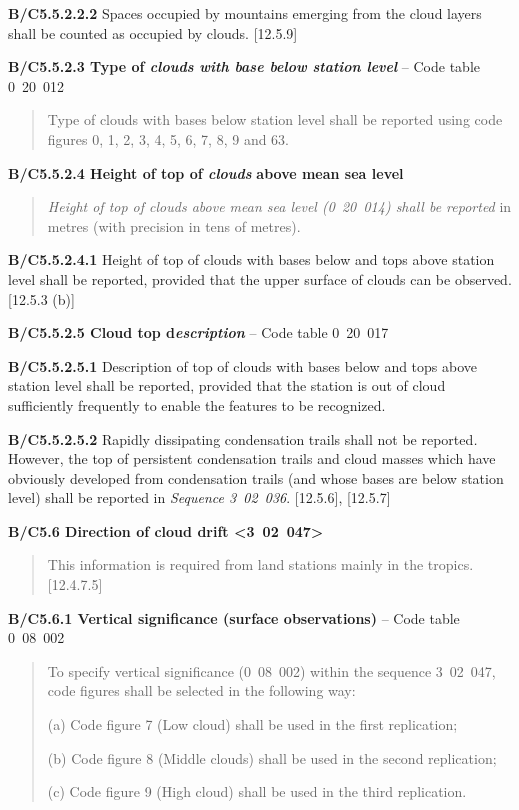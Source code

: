 \textbf{B/C5.5.2.2.2} Spaces occupied by mountains emerging from the cloud layers shall be counted as occupied by clouds. {[}12.5.9{]}

\textbf{B/C5.5.2.3 Type of \emph{clouds with base below station level}} -- Code table 0~20~012

\begin{quote}
Type of clouds with bases below station level shall be reported using code figures 0, 1, 2, 3, 4, 5, 6, 7, 8, 9 and 63.
\end{quote}

\textbf{B/C5.5.2.4 Height of top of \emph{clouds}} \textbf{above mean sea level}

\begin{quote}
\emph{Height of top of clouds above mean sea level (0~20~014) shall be reported} in metres (with precision in tens of metres).
\end{quote}

\textbf{B/C5.5.2.4.1} Height of top of clouds with bases below and tops above station level shall be reported, provided that the upper surface of clouds can be observed. {[}12.5.3 (b){]}

\textbf{B/C5.5.2.5 Cloud top d\emph{escription }}-- Code table 0~20~017

\textbf{B/C5.5.2.5.1} Description of top of clouds with bases below and tops above station level shall be reported, provided that the station is out of cloud sufficiently frequently to enable the features to be recognized.

\textbf{B/C5.5.2.5.2} Rapidly dissipating condensation trails shall not be reported\emph{.} However, the top of persistent condensation trails and cloud masses which have obviously developed from condensation trails (and whose bases are below station level) shall be reported in \emph{Sequence 3~02~036}. {[}12.5.6{]}, {[}12.5.7{]}

\textbf{B/C5.6 Direction of cloud drift \textless3~02~047\textgreater{}}

\begin{quote}
This information is required from land stations mainly in the tropics. {[}12.4.7.5{]}
\end{quote}

\textbf{B/C5.6.1 Vertical significance (surface observations)} -- Code table 0\emph{~}08\emph{~}002

\begin{quote}
To specify vertical significance (0~08~002) within the sequence 3~02~047, code figures shall be selected in the following way:

(a) Code figure 7 (Low cloud) shall be used in the first replication;

(b) Code figure 8 (Middle clouds) shall be used in the second replication;

(c) Code figure 9 (High cloud) shall be used in the third replication.
\end{quote}

